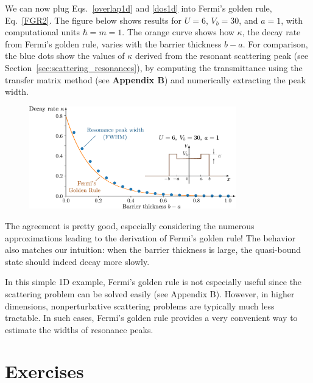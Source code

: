 \documentclass[prx,12pt]{revtex4-2}
\begin{document}
We can now plug Eqs.~\eqref{overlap1d} and \eqref{dos1d} into Fermi's
golden rule, Eq.~\eqref{FGR2}.  The figure below shows results for $U
= 6$, $V_b = 30$, and $a = 1$, with computational units $\hbar = m =
1$.  The orange curve shows how $\kappa$, the decay rate from Fermi's
golden rule, varies with the barrier thickness $b-a$.  For comparison,
the blue dots show the values of $\kappa$ derived from the resonant
scattering peak (see Section~\ref{sec:scattering_resonances}), by
computing the transmittance using the transfer matrix method (see
\textbf{Appendix B}) and numerically extracting the peak width.

\begin{figure}[h]
  \centering\includegraphics[width=0.8\textwidth]{goldenrule}
\end{figure}

\noindent
The agreement is pretty good, especially considering the numerous
approximations leading to the derivation of Fermi's golden rule!  The
behavior also matches our intuition: when the barrier thickness is
large, the quasi-bound state should indeed decay more slowly.

In this simple 1D example, Fermi's golden rule is not especially
useful since the scattering problem can be solved easily (see Appendix
B).  However, in higher dimensions, nonperturbative scattering
problems are typically much less tractable.  In such cases, Fermi's
golden rule provides a very convenient way to estimate the widths of
resonance peaks.

\section*{Exercises}
\end{document}
